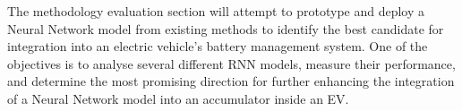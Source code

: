 %
The methodology evaluation section will attempt to prototype and deploy a Neural Network model from existing methods to identify the best candidate for integration into an electric vehicle's battery management system.
One of the objectives is to analyse several different RNN models, measure their performance, and determine the most promising direction for further enhancing the integration of a Neural Network model into an accumulator inside an EV.
%

